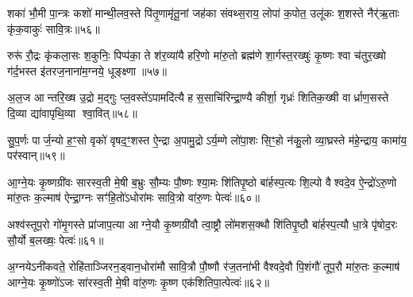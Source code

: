 शका॑ भौ॒मी पा॒न्त्रः कशो॑ मान्थी॒लव॒स्ते पि॑तृ॒णामृ॑तू॒नां जह॑का संवथ्स॒राय॒ लोपा॑ क॒पोत॒ उलू॑कः श॒शस्ते नैर्\mbox{}॑ऋ॒ताः कृ॑क॒वाकुः॑ सावि॒त्रः॥५६॥

{\anuvakamend[{बला॑य पुरुषमृ॒गः सौ॒री पृ॑ष॒तश्शका॒ष्टाद॑शा॒ष्टाद॑श॥14-18॥}]}

रुरू॑ रौ॒द्रः कृ॑कला॒सः श॒कुनिः॒ पिप्प॑का॒ ते श॑र॒व्या॑यै हरि॒णो मा॑रु॒तो ब्रह्म॑णे शा॒र्गस्त॒रख्षुः॑ कृ॒ष्णः श्वा च॑तुर॒ख्षो ग॑र्द॒भस्त इ॑तरज॒नाना॑म॒ग्नये॒ धूङ्क्ष्णा॥५७॥

{\anuvakamend[{रुरु॑र्विश॒तिः॥19॥}]}

अ॒ल॒ज आन्तरि॒ख्ष उ॒द्रो म॒द्गुः प्ल॒वस्ते॑ऽपामदि॑त्यै हस॒साचि॑रिन्द्रा॒ण्यै कीर्\mbox{}शा॒ गृध्रः॑ शितिक॒ख्षी वार्ध्राण॒सस्ते दि॒व्या द्या॑वापृथि॒व्या श्वा॒वित्॥५८॥

{\anuvakamend[{}]}

सु॒प॒र्णः पार्ज॒न्यो ह॒ꣳ॒सो वृको॑ वृषद॒ꣳ॒शस्त ऐ॒न्द्रा अ॒पामु॒द्रोऽर्य॒म्णे लो॑पा॒शः सि॒ꣳ॒हो न॑कु॒लो व्या॒घ्रस्ते म॑हे॒न्द्राय॒ कामा॑य॒ पर॑स्वान्॥५९॥

{\anuvakamend[{अ॒ल॒जस्सु॑प॒र्णोऽष्टाद॑शाष्टा॒द॑श॥21॥}]}

आ॒ग्ने॒यः कृ॒ष्णग्री॑वः सारस्व॒ती मे॒षी ब॒भ्रुः सौ॒म्यः पौ॒ष्णः श्या॒मः शि॑तिपृ॒ष्ठो बा॑र्\mbox{}हस्प॒त्यः शि॒ल्पो वैश्वदे॒व ऐ॒न्द्रो॑ऽरु॒णो मा॑रु॒तः क॒ल्माष॑ ऐन्द्रा॒ग्नः सꣳ॑हि॒तो॑ऽधोरा॑मः सावि॒त्रो वा॑रु॒णः पेत्वः॑॥६०॥

{\anuvakamend[{आ॒ग्ने॒यो द्वाविꣳ॑शतिः॥22॥}]}

अश्व॑स्तूप॒रो गो॑मृ॒गस्ते प्रा॑जाप॒त्या आग्ने॒यौ कृ॒ष्णग्री॑वौ त्वा॒ष्ट्रौ लो॑मशस॒क्थौ शि॑तिपृ॒ष्ठौ बा॑र्\mbox{}हस्प॒त्यौ धा॒त्रे पृ॑षोद॒रः सौ॒र्यो ब॒लख्षः॒ पेत्वः॑॥६१॥

{\anuvakamend[{अश्व॒ष्षोड॑श॥23॥}]}

अ॒ग्नयेऽनी॑कवते॒ रोहि॑ताञ्जिरन॒ड्वान॒धोरा॑मौ सावि॒त्रौ पौ॒ष्णौ र॑ज॒तना॑भी वैश्वदे॒वौ पि॒शंगौ॑ तूप॒रौ मा॑रु॒तः क॒ल्माष॑ आग्ने॒यः कृ॒ष्णो॑ऽजः सा॑रस्व॒ती मे॒षी वा॑रु॒णः कृ॒ष्ण एक॑शितिपा॒त्पेत्वः॑॥६२॥


{\anuvakamend[{अ॒ग्नयोऽनी॑कवते॒ द्वाविꣳ॑शतिः॥24॥}]}

{}

